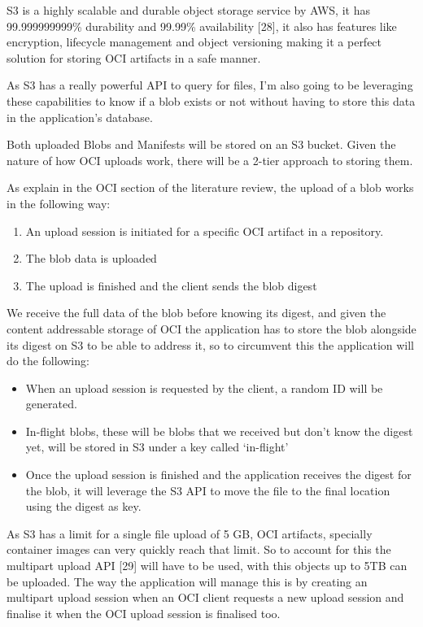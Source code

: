\documentclass{article}
\begin{document}
  S3 is a highly scalable and durable object storage service by AWS, it has 99.999999999\% durability and 99.99\% availability [28], it also has features like encryption, lifecycle management and object versioning making it a perfect solution for storing OCI artifacts in a safe manner.

  As S3 has a really powerful API to query for files, I'm also going to be leveraging these capabilities to know if a blob exists or not without having to store this data in the application's database.

  Both uploaded Blobs and Manifests will be stored on an S3 bucket. Given the nature of how OCI uploads work, there will be a 2-tier approach to storing them.

  As explain in the OCI section of the literature review, the upload of a blob works in the following way:

  \begin{enumerate}
    \item An upload session is initiated for a specific OCI artifact in a repository.
    \item The blob data is uploaded
    \item The upload is finished and the client sends the blob digest
  \end{enumerate}

  We receive the full data of the blob before knowing its digest, and given the content addressable storage of OCI the application has to store the blob alongside its digest on S3 to be able to address it, so to circumvent this the application will do the following:

  \begin{itemize}
    \item When an upload session is requested by the client, a random ID will be generated.
    \item In-flight blobs, these will be blobs that we received but don't know the digest yet, will be stored in S3 under a key called `in-flight'
    \item Once the upload session is finished and the application receives the digest for the blob, it will leverage the S3 API to move the file to the final location using the digest as key.
  \end{itemize}

  As S3 has a limit for a single file upload of 5 GB, OCI artifacts, specially container images can very quickly reach that limit. So to account for this the multipart upload API [29] will have to be used, with this objects up to 5TB can be uploaded. The way the application will manage this is by creating an multipart upload session when an OCI client requests a new upload session and finalise it when the OCI upload session is finalised too.
\end{document}
